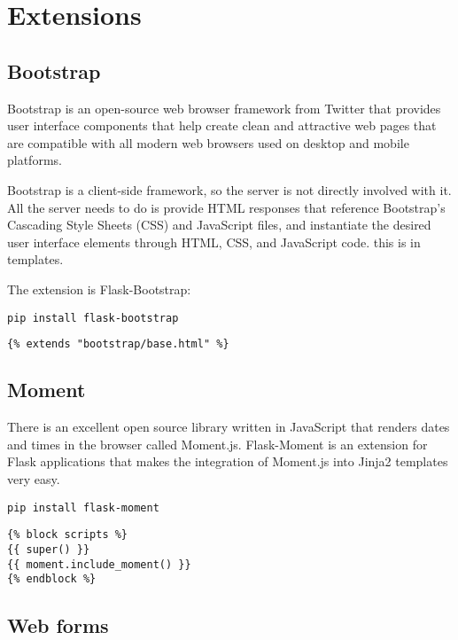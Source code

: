 
\chapter{Extensions}
\label{cha:extensions}

\section{Bootstrap}
\label{sec:bootstrap}

Bootstrap is an open-source web browser framework from Twitter that provides user interface components that help create clean and attractive web pages that are compatible with all modern web browsers used on desktop and mobile platforms.

Bootstrap is a client-side framework, so the server is not directly involved with it. All the server needs to do is provide HTML responses that reference Bootstrap’s Cascading Style Sheets (CSS) and JavaScript files, and instantiate the desired user interface elements through HTML, CSS, and JavaScript code. this is in templates.


The extension is Flask-Bootstrap:
\begin{lstlisting}
pip install flask-bootstrap
\end{lstlisting}

\begin{lstlisting}[language=html]
{% extends "bootstrap/base.html" %}
\end{lstlisting}


\section{Moment}
\label{sec:moment}

There is an excellent open source library written in JavaScript that renders dates and times in the browser called Moment.js.
Flask-Moment is an extension for Flask applications that makes the integration of Moment.js into Jinja2 templates very easy.
\begin{lstlisting}
pip install flask-moment
\end{lstlisting}
\begin{lstlisting}[caption={import the Moment.js library}]
{% block scripts %}
{{ super() }}
{{ moment.include_moment() }}
{% endblock %}
\end{lstlisting}

\section{Web forms}
\label{sec:web-forms}

